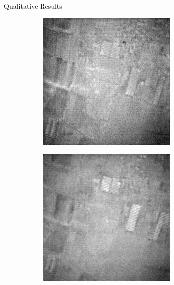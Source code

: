 \documentclass[final]{beamer}
\newlength{\colwidth}
\begin{document}
\begin{frame}[t]
\begin{columns}[t]
\begin{column}{\colwidth}
\begin{block}{Qualitative Results}
\begin{figure}
\begin{subfigure}[b]{0.19\textwidth}
        \end{subfigure}
        \hfill
        \begin{subfigure}[b]{0.19\textwidth}
            \centering
            \includegraphics[width=\textwidth]{../figs/outputs/cut/24.png}
        \end{subfigure}
        \hfill
        \begin{subfigure}[b]{0.19\textwidth}
            \centering
            \includegraphics[width=\textwidth]{../figs/outputs/petit/24.png}

\end{subfigure}
\end{figure}
\end{block}
\end{column}
\end{columns}
\end{frame}
\end{document}
